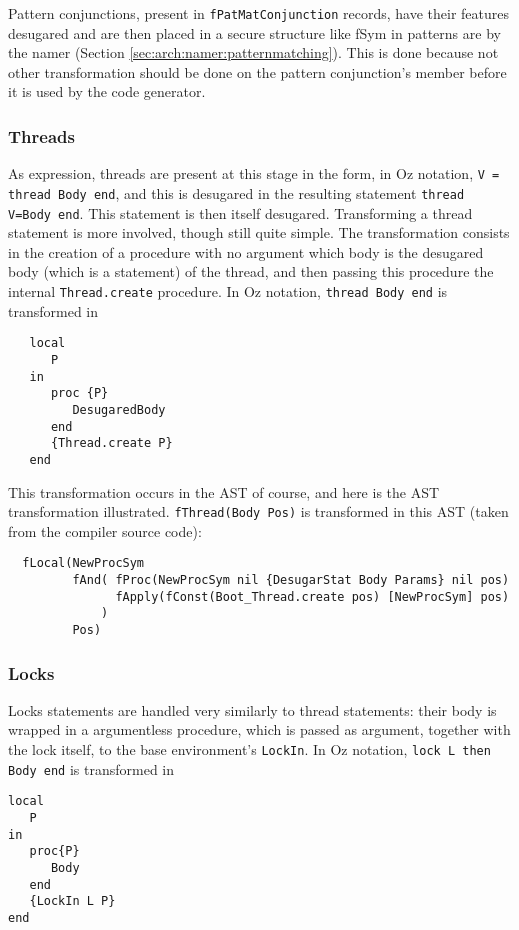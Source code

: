 \documentclass[a4paper]{memoir}
\begin{document}
Pattern conjunctions, present in \lstinline!fPatMatConjunction! records, have
their features desugared and are then placed in a secure structure like fSym in
patterns are by the namer (Section \ref{sec:arch:namer:patternmatching}).
This is done because not other transformation should be done on the pattern
conjunction's member before it is used by the code generator.


\subsubsection{Threads}
As expression, threads are present at this stage in the form, in Oz notation, \lstinline!V = thread Body end!, and this is desugared in the resulting statement \lstinline!thread V=Body end!. This statement is then itself desugared.
Transforming a thread statement is more involved, though still quite simple. The transformation consists in the creation of a procedure with no argument which body is the desugared body (which is a statement) of the thread, and then passing this procedure the internal \lstinline!Thread.create! procedure.
In Oz notation, \lstinline!thread Body end! is transformed in 
\begin{lstlisting}
   local 
      P 
   in 
      proc {P} 
         DesugaredBody 
      end 
      {Thread.create P}
   end
\end{lstlisting}
This transformation occurs in the AST of course, and here is the AST transformation illustrated. \lstinline!fThread(Body Pos)! is transformed in this AST (taken from the compiler source code):
\begin{lstlisting}
  fLocal(NewProcSym 
         fAnd( fProc(NewProcSym nil {DesugarStat Body Params} nil pos) 
               fApply(fConst(Boot_Thread.create pos) [NewProcSym] pos)
             ) 
         Pos)
\end{lstlisting}

\subsubsection{Locks}
Locks statements are handled very similarly to thread statements: their body is
wrapped in a argumentless procedure, which is passed as argument, together with
the lock itself, to the base environment's \lstinline!LockIn!. In Oz notation, \lstinline!lock L then Body end! is transformed in
\begin{lstlisting}
local
   P
in
   proc{P}
      Body
   end
   {LockIn L P}
end
\end{lstlisting}
\end{document}
